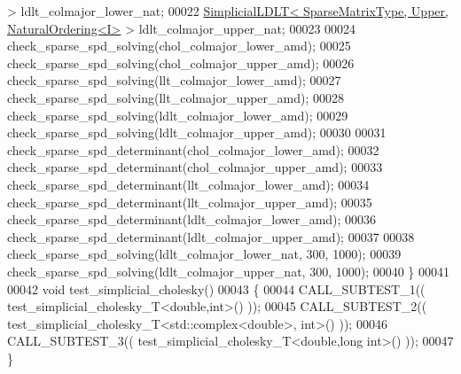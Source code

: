 \begin{DoxyCode}
       > ldlt\_colmajor\_lower\_nat;
00022   \hyperlink{group___sparse_cholesky___module_class_eigen_1_1_simplicial_l_d_l_t}{SimplicialLDLT<    SparseMatrixType, Upper, NaturalOrdering<I>}
       > ldlt\_colmajor\_upper\_nat;
00023 
00024   check\_sparse\_spd\_solving(chol\_colmajor\_lower\_amd);
00025   check\_sparse\_spd\_solving(chol\_colmajor\_upper\_amd);
00026   check\_sparse\_spd\_solving(llt\_colmajor\_lower\_amd);
00027   check\_sparse\_spd\_solving(llt\_colmajor\_upper\_amd);
00028   check\_sparse\_spd\_solving(ldlt\_colmajor\_lower\_amd);
00029   check\_sparse\_spd\_solving(ldlt\_colmajor\_upper\_amd);
00030   
00031   check\_sparse\_spd\_determinant(chol\_colmajor\_lower\_amd);
00032   check\_sparse\_spd\_determinant(chol\_colmajor\_upper\_amd);
00033   check\_sparse\_spd\_determinant(llt\_colmajor\_lower\_amd);
00034   check\_sparse\_spd\_determinant(llt\_colmajor\_upper\_amd);
00035   check\_sparse\_spd\_determinant(ldlt\_colmajor\_lower\_amd);
00036   check\_sparse\_spd\_determinant(ldlt\_colmajor\_upper\_amd);
00037   
00038   check\_sparse\_spd\_solving(ldlt\_colmajor\_lower\_nat, 300, 1000);
00039   check\_sparse\_spd\_solving(ldlt\_colmajor\_upper\_nat, 300, 1000);
00040 \}
00041 
00042 \textcolor{keywordtype}{void} test\_simplicial\_cholesky()
00043 \{
00044   CALL\_SUBTEST\_1(( test\_simplicial\_cholesky\_T<double,int>() ));
00045   CALL\_SUBTEST\_2(( test\_simplicial\_cholesky\_T<std::complex<double>, \textcolor{keywordtype}{int}>() ));
00046   CALL\_SUBTEST\_3(( test\_simplicial\_cholesky\_T<double,long int>() ));
00047 \}
\end{DoxyCode}
